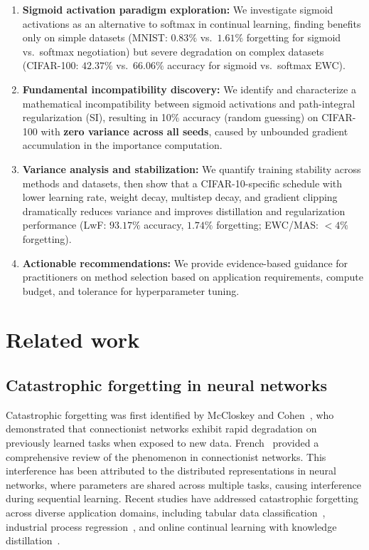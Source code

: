 \documentclass[preprint,review,12pt]{elsarticle}
\begin{document}
\begin{enumerate}
\item \textbf{Sigmoid activation paradigm exploration:} We investigate sigmoid activations as an alternative to softmax in continual learning, finding benefits only on simple datasets (MNIST: $0.83\%$ vs.\ $1.61\%$ forgetting for sigmoid vs.\ softmax negotiation) but severe degradation on complex datasets (CIFAR-100: $42.37\%$ vs.\ $66.06\%$ accuracy for sigmoid vs.\ softmax EWC).

\item \textbf{Fundamental incompatibility discovery:} We identify and characterize a mathematical incompatibility between sigmoid activations and path-integral regularization (SI), resulting in 10\% accuracy (random guessing) on CIFAR-100 with \textbf{zero variance across all seeds}, caused by unbounded gradient accumulation in the importance computation.

\item \textbf{Variance analysis and stabilization:} We quantify training stability across methods and datasets, then show that a CIFAR-10-specific schedule with lower learning rate, weight decay, multistep decay, and gradient clipping dramatically reduces variance and improves distillation and regularization performance (LwF: $93.17\%$ accuracy, $1.74\%$ forgetting; EWC/MAS: $<4\%$ forgetting).

\item \textbf{Actionable recommendations:} We provide evidence-based guidance for practitioners on method selection based on application requirements, compute budget, and tolerance for hyperparameter tuning.
\end{enumerate}

\section{Related work}

\subsection{Catastrophic forgetting in neural networks}

Catastrophic forgetting was first identified by McCloskey and Cohen~\cite{mccloskey1989catastrophic}, who demonstrated that connectionist networks exhibit rapid degradation on previously learned tasks when exposed to new data. French~\cite{french1999catastrophic} provided a comprehensive review of the phenomenon in connectionist networks. This interference has been attributed to the distributed representations in neural networks, where parameters are shared across multiple tasks, causing interference during sequential learning. Recent studies have addressed catastrophic forgetting across diverse application domains, including tabular data classification~\cite{garcia2025tabular}, industrial process regression~\cite{groteramm2023regression}, and online continual learning with knowledge distillation~\cite{han2022online}.
\end{document}
